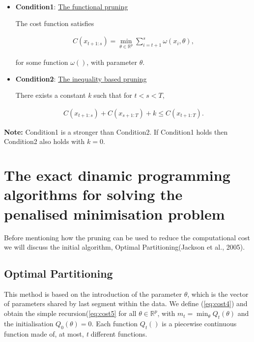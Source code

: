 \documentclass[a4paper,12pt]{article}
\begin{document}
		 \begin{itemize}
		 	
		 	\item \textbf{Condition1}: \underline {The functional pruning}
		 	
		 	 The cost function satisfies
		 	 
		 	 \begin{equation}
		 	 	\begin{gathered}
		 	 		C(x_{t+1:s}) = \min_{\theta \in \mathbb{R}^p} \sum_{i=t+1}^{s}\omega(x_i,\theta),
		 	 	\end{gathered}
		 	 	\label{eq:cond1}
		 	 \end{equation}
		 	 
		 	 for some function $\omega()$, with parameter $\theta$.
		 	 
		 	
		 	\item \textbf{Condition2}: \underline {The inequality based pruning}
		 	
		 	There exists a constant \textit{k} such that for $t < s < T$,
		 	
		 	 \begin{equation}
		 		\begin{gathered}
		 			C(x_{t+1:s}) + 	C(x_{s+1:T}) +k \le C(x_{t+1:T}).
		 		\end{gathered}
		 		\label{eq:cond2}
		 	\end{equation}
	 		
		\end{itemize}
	
		\textbf{Note:} Condition1 is a stronger than Condition2. If Condition1 holds then Condition2 also holds with $k = 0$.
		
		 
		
		
	\section{The exact dinamic programming algorithms for solving the penalised minimisation problem}
	\label{section2}
	
	Before mentioning how the pruning can be used to reduce the computational cost we will discuss the initial algorithm, Optimal Partitioning(Jackson et al., 2005). 
	
		\subsection{Optimal Partitioning}
		\label{OP}
		 This method is based on the introduction of the parameter $\theta$, which is the vector of parameters shared by last segment within the data. We define (\ref{eq:cost4}) and obtain the simple recursion(\ref{eq:cost5} for all  $\theta \in\mathbb{R}^p$, with $m_t = \min_\theta Q_t(\theta)$ and the initialisation $Q_0(\theta) = 0$. Each function $Q_t()$ is a piecewise continuous function made of, at most, \textit{t} different functions.
		 
\end{document}
